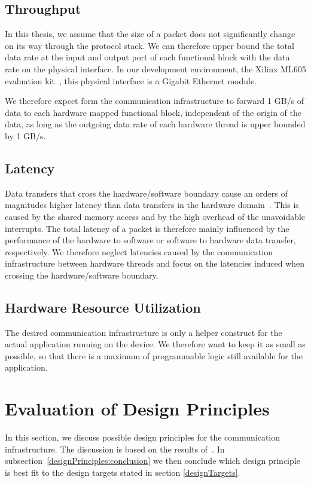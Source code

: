 \subsection{Throughput}
In this thesis, we assume that the size of a packet does not significantly change on its way through the protocol stack. We can therefore upper bound the total data rate at the input and output port of each functional block with the data rate on the physical interface. In our development environment, the Xilinx ML605 evaluation kit~\cite{ml605}, this physical interface is a Gigabit Ethernet module.

We therefore expect form the communication infrastructure to forward 1 GB/s of data to each hardware mapped functional block, independent of the origin of the data, as long as the outgoing data rate of each hardware thread is upper bounded by 1 GB/s.

\subsection{Latency}
Data transfers that cross the hardware/software boundary cause an orders of magnitudes higher latency than data transfers in the hardware domain~\cite{reconfigurableNodesForFutureNetworks}. This is caused by the shared memory access and by the high overhead of the unavoidable interrupts. The total latency of a packet is therefore mainly influenced by the performance of the hardware to software or software to hardware data transfer, respectively. We therefore neglect latencies caused by the communication infrastructure between hardware threads and focus on the latencies induced when crossing the hardware/software boundary.

\subsection{Hardware Resource Utilization}
The desired communication infrastructure is only a helper construct for the actual application running on the device. We therefore want to keep it as small as possible, so that there is a maximum of programmable logic still available for the application.

\section{Evaluation of Design Principles}
In this section, we discuss possible design principles for the communication infrastructure. The discussion is based on the results of~\cite{communicationArchitectureExploration}. In subsection~\ref{designPrinciples:conclusion} we then conclude which design principle is best fit to the design targets stated in section \ref{designTargets}.

